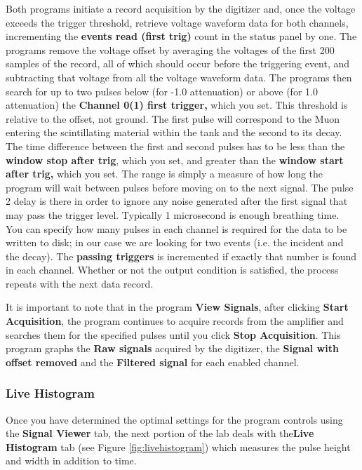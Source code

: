 \documentclass{../lab}
\begin{document}
Both programs initiate a record acquisition by the digitizer and, once the voltage exceeds the trigger threshold, retrieve voltage waveform data for both channels, incrementing the \textbf{events read (first trig)} count in the status panel by one. The programs remove the voltage offset by averaging the voltages of the first 200 samples of the record, all of which should occur before the triggering event, and subtracting that voltage from all the voltage waveform data. The programs then search for up to two pulses below (for -1.0 attenuation) or above (for 1.0 attenuation) the \textbf{Channel 0(1) first trigger,} which you set. This threshold is relative to the offset, not ground. The first pulse will correspond to the Muon entering the scintillating material within the tank and the second to its decay. The time difference between the first and second pulses has to be less than the \textbf{window stop after trig}, which you set, and greater than the \textbf{window start after trig,} which you set. The range is simply a measure of how long the program will wait between pulses before moving on to the next signal. The pulse 2 delay is there in order to ignore any noise generated after the first signal that may pass the trigger level. Typically 1 microsecond is enough breathing time. You can specify how many pulses in each channel is required for the data to be written to disk; in our case we are looking for two events (i.e. the incident and the decay). The \textbf{passing triggers} is incremented if exactly that number is found in each channel. Whether or not the output condition is satisfied, the process repeats with the next data record.

It is important to note that in the program \textbf{View Signals}, after clicking \textbf{Start Acquisition}, the program continues to acquire records from the amplifier and searches them for the specified pulses until you click \textbf{Stop Acquisition}. This program graphs the \textbf{Raw signals} acquired by the digitizer, the \textbf{Signal with offset removed} and the \textbf{Filtered signal} for each enabled channel.

\subsubsection{Live Histogram}

Once you have determined the optimal settings for the program controls using the \textbf{Signal Viewer} tab, the next portion of the lab deals with the\textbf{Live Histogram} tab (see Figure \ref{fig:livehistogram}) which measures the pulse height and width in addition to time.
\end{document}
